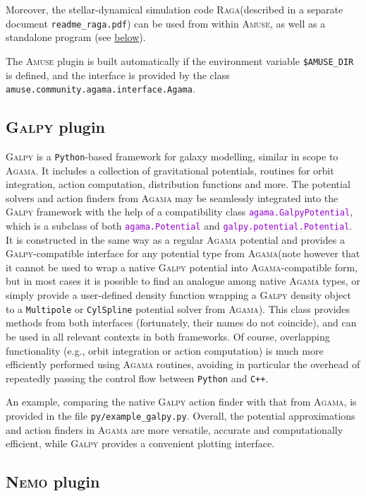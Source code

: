 \documentclass[12pt]{article}
\newcommand{\Agama}{\textsc{Agama}\xspace}
\newcommand{\Amuse}{\textsc{Amuse}\xspace}
\newcommand{\Galpy}{\textsc{Galpy}\xspace}
\newcommand{\Nemo} {\textsc{Nemo}\xspace}
\newcommand{\Raga} {\textsc{Raga}\xspace}
\newcommand{\Cpp}  {\texttt{C++}\xspace}
\newcommand{\Python}{\texttt{Python}\xspace}
\newcommand{\ttt}[1]{\textcolor{darkviolet}{\texttt{#1}}}
\newcommand{\ppp}[1]{\textcolor{darkolive} {\texttt{#1}}}
\begin{document}
Moreover, the stellar-dynamical simulation code \Raga (described in a separate document \texttt{readme_raga.pdf}) can be used from within \Amuse, as well as a standalone program (see \hyperref[sec:raga]{below}).

The \Amuse plugin is built automatically if the environment variable \texttt{\$AMUSE_DIR} is defined, and the interface is provided by the class \texttt{amuse.community.agama.interface.Agama}.


\subsection{\Galpy plugin}  \label{sec:Galpy}

\Galpy \cite{Bovy2015} is a \Python-based framework for galaxy modelling, similar in scope to \Agama. It includes a collection of gravitational potentials, routines for orbit integration, action computation, distribution functions and more. 
The potential solvers and action finders from \Agama may be seamlessly integrated into the \Galpy framework with the help of a compatibility class \ttt{agama.GalpyPotential}, which is a subclass of both \ttt{agama.Potential} and \ttt{galpy.potential.Potential}. It is constructed in the same way as a regular \Agama potential and provides a \Galpy-compatible interface for any potential type from \Agama (note however that it cannot be used to wrap a native \Galpy potential into \Agama-compatible form, but in most cases it is possible to find an analogue among native \Agama types, or simply provide a user-defined density function wrapping a \Galpy density object to a \ppp{Multipole} or \ppp{CylSpline} potential solver from \Agama). This class provides methods from both interfaces (fortunately, their names do not coincide), and can be used in all relevant contexts in both frameworks. Of course, overlapping functionality (e.g., orbit integration or action computation) is much more efficiently performed using \Agama routines, avoiding in particular the overhead of repeatedly passing the control flow between \Python and \Cpp.

An example, comparing the native \Galpy action finder with that from \Agama, is provided in the file \texttt{py/example_galpy.py}. Overall, the potential approximations and action finders in \Agama are more versatile, accurate and computationally efficient, while \Galpy provides a convenient plotting interface.


\subsection{\Nemo plugin}  \label{sec:Nemo}
\end{document}
